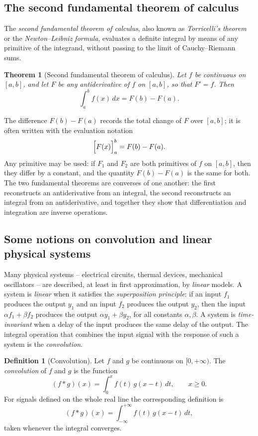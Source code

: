 \documentclass[11pt,a4paper]{article}
\theoremstyle{definition} \newtheorem{definition}{Definition} \theoremstyle{plain} \newtheorem{theorem}{Theorem}
\begin{document}
\subsection{The second fundamental theorem of calculus}
The \emph{second fundamental theorem of calculus}, also known as \emph{Torricelli's theorem} or the \emph{Newton--Leibniz formula}, evaluates a definite integral by means of any primitive of the integrand, without passing to the limit of Cauchy--Riemann sums.
\begin{theorem}[Second fundamental theorem of calculus]\label{thm:ftc-two} Let $f$ be continuous on $[a,b]$, and let $F$ be any antiderivative of $f$ on $[a,b]$, so that $F'=f$.
Then \[ \int_a^b f(x)\,dx = F(b) - F(a). \] \end{theorem}
The difference $F(b)-F(a)$ records the total change of $F$ over $[a,b]$; it is often written with the evaluation notation \[ \Bigl[ F(x) \Bigr]_a^b = F(b)-F(a). \]
Any primitive may be used: if $F_1$ and $F_2$ are both primitives of $f$ on $[a,b]$, then they differ by a constant, and the quantity $F(b)-F(a)$ is the same for both.
The two fundamental theorems are converses of one another: the first reconstructs an antiderivative from an integral, the second reconstructs an integral from an antiderivative, and together they show that differentiation and integration are inverse operations.

\subsection{Some notions on convolution and linear physical systems}
Many physical systems -- electrical circuits, thermal devices, mechanical oscillators -- are described, at least in first approximation, by \emph{linear} models.  A system is \emph{linear} when it satisfies the \emph{superposition principle}: if an input $f_1$ produces the output $y_1$ and an input $f_2$ produces the output $y_2$, then the input $\alpha f_1+\beta f_2$ produces the output $\alpha y_1+\beta y_2$, for all constants $\alpha,\beta$.  A system is \emph{time-invariant} when a delay of the input produces the same delay of the output.  The integral operation that combines the input signal with the response of such a system is the \emph{convolution}.

\begin{definition}[Convolution] Let $f$ and $g$ be continuous on $[0,+\infty)$.  The \emph{convolution} of $f$ and $g$ is the function
\[
(f*g)(x) = \int_0^{x} f(t)\,g(x-t)\,dt, \qquad x\ge 0.
\]
For signals defined on the whole real line the corresponding definition is
\[
(f*g)(x) = \int_{-\infty}^{+\infty} f(t)\,g(x-t)\,dt,
\]
taken whenever the integral converges. \end{definition}
\end{document}

